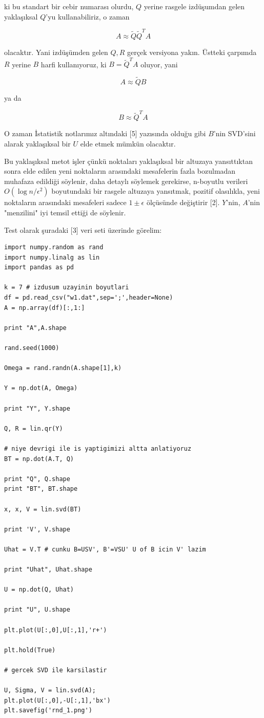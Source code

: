 \documentclass[12pt,fleqn]{article}\usepackage{../../common}
\begin{document}
ki bu standart bir cebir numarası olurdu, $Q$ yerine rasgele
izdüşumdan gelen yaklaşıksal $Q$'yu kullanabiliriz, o zaman

$$ A \approx \tilde{Q}\tilde{Q}^TA $$

olacaktır. Yani izdüşümden gelen $Q,R$ gerçek versiyona yakın. Üstteki
çarpımda $R$ yerine $B$ harfi kullanıyoruz, ki $B = \tilde{Q}^T A$
oluyor, yani

$$ A \approx \tilde{Q}B $$

ya da 

$$ B \approx \tilde{Q}^T A $$

O zaman İstatistik notlarımız altındaki [5] yazısında olduğu gibi $B$'nin
SVD'sini alarak yaklaşıksal bir $U$ elde etmek mümkün olacaktır.

Bu yaklaşıksal metot işler çünkü noktaları yaklaşıksal bir altuzaya
yansıttıktan sonra elde edilen yeni noktaların arasındaki mesafelerin
fazla bozulmadan muhafaza edildiği söylenir, daha detaylı söylemek
gerekirse, n-boyutlu verileri $O(\log n / \epsilon^2)$ boyutundaki bir
rasgele altuzaya yansıtmak, pozitif olasılıkla, yeni noktaların
arasındaki mesafeleri sadece $1 \pm \epsilon$ ölçüsünde değiştirir
[2]. $Y$'nin, $A$'nin "menzilini" iyi temsil ettiği de söylenir.

Test olarak şuradaki [3] veri seti üzerinde görelim:

\begin{verbatim}
import numpy.random as rand
import numpy.linalg as lin
import pandas as pd

k = 7 # izdusum uzayinin boyutlari
df = pd.read_csv("w1.dat",sep=';',header=None)
A = np.array(df)[:,1:]

print "A",A.shape

rand.seed(1000)

Omega = rand.randn(A.shape[1],k)

Y = np.dot(A, Omega) 

print "Y", Y.shape

Q, R = lin.qr(Y) 

# niye devrigi ile is yaptigimizi altta anlatiyoruz
BT = np.dot(A.T, Q)

print "Q", Q.shape
print "BT", BT.shape

x, x, V = lin.svd(BT)

print 'V', V.shape

Uhat = V.T # cunku B=USV', B'=VSU' U of B icin V' lazim

print "Uhat", Uhat.shape

U = np.dot(Q, Uhat) 

print "U", U.shape

plt.plot(U[:,0],U[:,1],'r+')

plt.hold(True)
        
# gercek SVD ile karsilastir

U, Sigma, V = lin.svd(A);
plt.plot(U[:,0],-U[:,1],'bx')
plt.savefig('rnd_1.png')
\end{verbatim}
\end{document}
